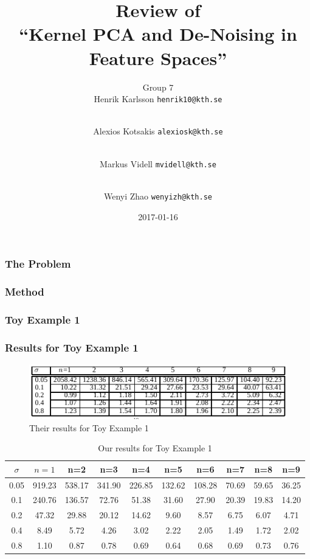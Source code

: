 \documentclass{beamer}
\title{\small{Review of\\``Kernel PCA and De-Noising in Feature Spaces''}}
\author{
    Group 7\\
    Henrik Karlsson \texttt{henrik10@kth.se} \and \\
    Alexios Kotsakis \texttt{alexiosk@kth.se}\and \\
    Markus Videll \texttt{mvidell@kth.se}\and \\
    Wenyi Zhao \texttt{wenyizh@kth.se}\and
}
\institute{KTH}
\date{2017-01-16}
\begin{document}
\begin{frame}
    \titlepage
\end{frame}

\begin{frame}
    \frametitle{The Problem}

\end{frame}


\begin{frame}
    \frametitle{Method}
\end{frame}


\begin{frame}
    \frametitle{Toy Example 1}

\end{frame}

\begin{frame}
    \frametitle{Results for Toy Example 1}
    \begin{figure}
    \includegraphics[width=\textwidth]{images/paper-toy1}
        \caption*{Their results for Toy Example 1}
    \end{figure}

    \begin{table}
        \begin{adjustbox}{width=\textwidth}
        \begin{tabular}{c|ccccccccc}
            $\sigma$ & $n=1$ & n=2 & n=3 & n=4 & n=5 & n=6 & n=7 & n=8 & n=9\\
        \hline 0.05 & 919.23 & 538.17 & 341.90 & 226.85 & 132.62 & 108.28 &
        70.69 & 59.65 & 36.25 \\ 0.1 & 240.76 & 136.57 &  72.76 &  51.38 &
        31.60 & 27.90 & 20.39 & 19.83 & 14.20 \\ 0.2 &  47.32 &  29.88 &
        20.12 &  14.62 & 9.60 &   8.57 &  6.75 & 6.07 &  4.71 \\ 0.4 &   8.49
        &   5.72 &   4.26 &   3.02 & 2.22 & 2.05 &  1.49 &  1.72 &  2.02 \\
        0.8 &   1.10 &   0.87 &   0.78 & 0.69 &   0.64 &   0.68 &  0.69 &
            0.73 &  0.76 \\ \hline
        \end{tabular}
        \end{adjustbox}
        \caption*{Our results for Toy Example 1}
    \end{table}
\end{frame}
\end{document}
